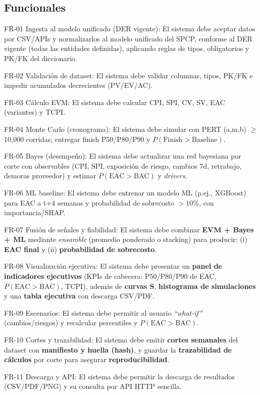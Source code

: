\documentclass[12pt]
{charter}
\begin{document}
\subsection{Funcionales}
\begin{description}
  \item FR-01 Ingesta al modelo unificado (DER vigente): El sistema debe aceptar datos por CSV/APIs y normalizarlos al modelo unificado del SPCP, conforme al DER vigente (todas las entidades definidas), aplicando reglas de tipos, obligatorios y PK/FK del diccionario.

  \item FR-02 Validación de dataset: El sistema debe validar columnas, tipos, PK/FK e impedir acumulados decrecientes (PV/EV/AC).

  \item FR-03 Cálculo EVM: El sistema debe calcular CPI, SPI, CV, SV, EAC (variantes) y TCPI.

  \item FR-04 Monte Carlo (cronograma): El sistema debe simular con PERT (a,m,b) $\geq$ 10{,}000 corridas; entregar finish P50/P80/P90 y $P(\text{Finish}>\text{Baseline})$.

  \item FR-05 Bayes (desempeño): El sistema debe actualizar una red bayesiana por corte con observables (CPI, SPI, exposición de riesgo, cambios 7d, retrabajo, demoras proveedor) y estimar $P(\text{EAC}>\text{BAC})$ y \textit{drivers}.

  \item FR-06 ML baseline: El sistema debe entrenar un modelo ML (p.ej., XGBoost) para EAC a t+4 semanas y probabilidad de sobrecosto $>10\%$, con importancia/SHAP.

  \item FR-07 Fusión de señales y fiabilidad: El sistema debe combinar \textbf{EVM + Bayes + ML} mediante \textit{ensamble} (promedio ponderado o stacking) para producir: (i) \textbf{EAC final} y (ii) \textbf{probabilidad de sobrecosto}. 

  \item FR-08 Visualización ejecutiva: El sistema debe presentar un \textbf{panel de indicadores ejecutivos} (KPIs de cabecera: P50/P80/P90 de EAC, $P(\text{EAC}>\text{BAC})$, TCPI), además de \textbf{curvas S}, \textbf{histograma de simulaciones} y una \textbf{tabla ejecutiva} con descarga CSV/PDF.

  \item FR-09 Escenarios: El sistema debe permitir al usuario \textit{“what-if”} (cambios/riesgos) y recalcular percentiles y $P(\text{EAC}>\text{BAC})$.

  \item FR-10 Cortes y trazabilidad: El sistema debe emitir \textbf{cortes semanales} del dataset con \textbf{manifiesto y huella (hash)}, y guardar la \textbf{trazabilidad de cálculos} por corte para asegurar \textbf{reproducibilidad}.

  \item FR-11 Descarga y API: El sistema debe permitir la descarga de resultados (CSV/PDF/PNG) y su consulta por API HTTP sencilla.

\end{description}
\end{document}

